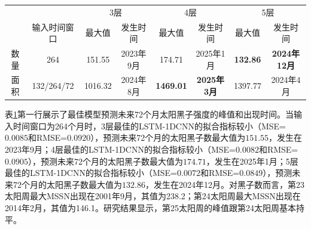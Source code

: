 \begin{table}[!htbp]
\centering
{}
\label{tab:ss_out_72}
\footnotesize
\begin{tabular}{cccccccc}
    \toprule
    &  & \multicolumn{2}{c}{3层} & \multicolumn{2}{c}{4层} & \multicolumn{2}{c}{5层}\\
    \cmidrule(lr){3-4} \cmidrule(lr){5-6} \cmidrule(lr){7-8}
    \noalign{\smallskip}
     & 输入时间窗口 & 最大值 & 发生时间 & 最大值 & 发生时间 & 最大值 & 发生时间 \\
    \midrule
    数量 & 264 & 151.55 & 2023年9月 & 174.71 & 2025年1月 & \textbf{132.86} & \textbf{2024年12月} \\
    面积 & 132/264/72 & 1016.32 & 2024年8月 & \textbf{1469.01} & \textbf{2025年3月} & 1397.77 & 2024年4月 \\
    \bottomrule
  \end{tabular}
\end{table}

表\ref{tab:ss_out_72}第一行展示了最佳模型预测未来72个月太阳黑子强度的峰值和出现时间。当输入时间窗口为264个月时，3层最佳的LSTM-1DCNN的拟合指标较小（MSE=$0.0085$和RMSE=$0.0920$），预测未来72个月的太阳黑子数最大值为$151.55$，发生在2023年9月；4层最佳的LSTM-1DCNN的拟合指标较小（MSE=$0.0082$和RMSE=$0.0905$），预测未来72个月的太阳黑子数最大值为$174.71$，发生在2025年1月；5层最佳的LSTM-1DCNN的拟合指标较小（MSE=$0.0072$和RMSE=$0.0849$），预测未来72个月的太阳黑子数最大值为$132.86$，发生在2024年12月。对黑子数而言，第23太阳周最大MSSN出现在2001年9月，其值为238.2；第24太阳周最大MSSN出现在2014年2月，其值为146.1。研究结果显示，第25太阳周的峰值跟第24太阳周基本持平。 

